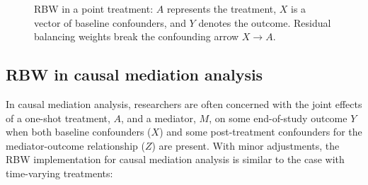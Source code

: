 \begin{figure} [ht]
\begin{center}
\end{center}
\caption{RBW in a point treatment: \(A\) represents the treatment,
\(X\) is a vector of baseline confounders, and \(Y\) denotes the outcome.
Residual balancing weights break the confounding arrow \(X\rightarrow A\).}
\label{fig:2}
\end{figure}

\hypertarget{rbw-mediation}{%
\subsection{RBW in causal mediation analysis}\label{rbw-mediation}}

In causal mediation analysis, researchers are often concerned with the
joint effects of a one-shot treatment, \(A\), and a mediator, \(M\), on
some end-of-study outcome \(Y\) when both baseline confounders (\(X\))
and some post-treatment confounders for the mediator-outcome
relationship (\(Z\)) are present. With minor adjustments, the RBW
implementation for causal mediation analysis is similar to the case with
time-varying treatments:

